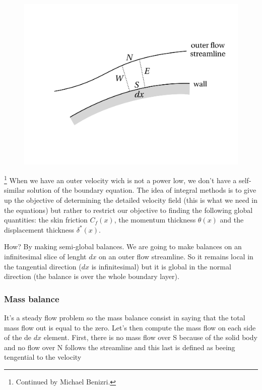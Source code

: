 \begin{figure}
\vspace{-5mm}
\includegraphics[scale=0.2]{ch5/16}
\end{figure}


\footnote{Continued by Michael Benizri.} When we have an outer velocity wich is not a power low, we don't have a self-similar solution of the boundary equation. The idea of integral methods is to give up the objective of determining the detailed velocity field (this is what we need in the equations) but rather to restrict our objective to finding the following global quantities: the skin friction $C_f(x)$, the momentum thickness $\theta (x)$ and the displacement thickness $\delta ^*(x)$.

How? By making semi-global balances. We are going to make balances on an infinitesimal slice of lenght $dx$ on an outer flow streamline. So it remains local in the tangential direction ($dx$ is infinitesimal) but it is global in the normal direction (the balance is over the whole boundary layer).

\subsubsection{Mass balance} 
It's a steady flow problem so the mass balance consist in saying that the total mass flow out is equal to the zero. Let's then compute the mass flow on each side of the de $dx$ element. First, there is no mass flow over S because of the solid body and no flow over N follows the streamline and this last is defined as beeing tengential to the velocity 

